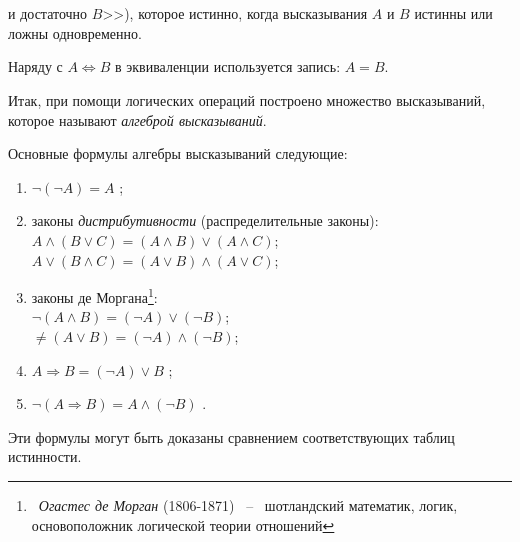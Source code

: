 \documentclass[a4paper,14pt]{article}
\begin{document}
\onehalfspacing
\section*{}
\setcounter{section}{1}
\noindent и достаточно $B$>>), которое истинно, когда высказывания $A$ и $B$ истинны или ложны одновременно.
\par Наряду с $A \Leftrightarrow B$ в эквиваленции используется запись: $A = B$.
\par Итак, при помощи логических операций построено множество высказываний, которое называют \emph{алгеброй высказываний}.
\par Основные формулы алгебры высказываний следующие:
\begin{enumerate}
    \item $\neg (\neg A) = A$ \label{enum:1:1};
    \item законы \emph{дистрибутивности} (распределительные законы): \\
          $A \wedge (B \vee C) = (A \wedge B) \vee (A \wedge C)$; \\
          $A \vee (B \wedge C) = (A \vee B) \wedge (A \vee C)$;
    \item законы де Моргана\footnote[2]{\small{~\emph{Огастес де Морган} (1806-1871) ~--~ шотландский математик, логик, основоположник логической теории отношений}}: \\
          $\neg(A \wedge B) = (\neg A) \vee (\neg B)$; \\
          $\neq(A \vee B) = (\neg A) \wedge (\neg B)$;
    \item $A \Rightarrow B = (\neg A) \vee B$ \label{enum:1:4};
    \item $\neg(A \Rightarrow B) = A \wedge (\neg B)$ \label{enum:1:5}.
\end{enumerate}
\par Эти формулы могут быть доказаны сравнением соответствующих таблиц истинности.
\end{document}
